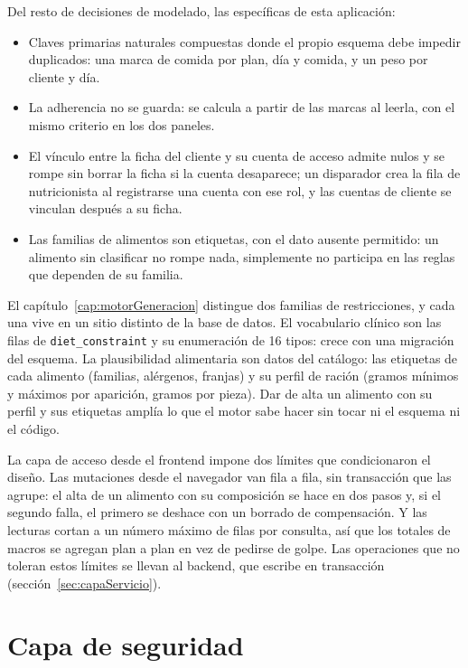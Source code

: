Del resto de decisiones de modelado, las específicas de esta aplicación:

\begin{itemize}
    \item Claves primarias naturales compuestas donde el propio esquema debe impedir duplicados: una marca de comida por plan, día y comida, y un peso por cliente y día.
    \item La adherencia no se guarda: se calcula a partir de las marcas al leerla, con el mismo criterio en los dos paneles.
    \item El vínculo entre la ficha del cliente y su cuenta de acceso admite nulos y se rompe sin borrar la ficha si la cuenta desaparece; un disparador crea la fila de nutricionista al registrarse una cuenta con ese rol, y las cuentas de cliente se vinculan después a su ficha.
    \item Las familias de alimentos son etiquetas, con el dato ausente permitido: un alimento sin clasificar no rompe nada, simplemente no participa en las reglas que dependen de su familia.
\end{itemize}

El capítulo~\ref{cap:motorGeneracion} distingue dos familias de restricciones, y cada una vive en un sitio distinto de la base de datos. El vocabulario clínico son las filas de \texttt{diet\_constraint} y su enumeración de 16 tipos: crece con una migración del esquema. La plausibilidad alimentaria son datos del catálogo: las etiquetas de cada alimento (familias, alérgenos, franjas) y su perfil de ración (gramos mínimos y máximos por aparición, gramos por pieza). Dar de alta un alimento con su perfil y sus etiquetas amplía lo que el motor sabe hacer sin tocar ni el esquema ni el código.

La capa de acceso desde el frontend impone dos límites que condicionaron el diseño. Las mutaciones desde el navegador van fila a fila, sin transacción que las agrupe: el alta de un alimento con su composición se hace en dos pasos y, si el segundo falla, el primero se deshace con un borrado de compensación. Y las lecturas cortan a un número máximo de filas por consulta, así que los totales de macros se agregan plan a plan en vez de pedirse de golpe. Las operaciones que no toleran estos límites se llevan al backend, que escribe en transacción (sección~\ref{sec:capaServicio}).

\section{Capa de seguridad}
\label{sec:capaSeguridad}

